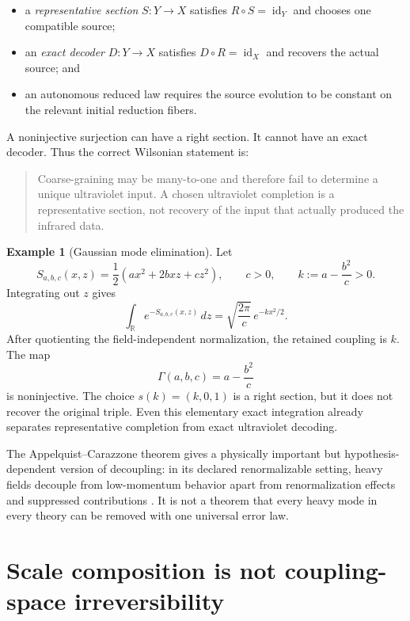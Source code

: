 \documentclass[11pt]{article}
\theoremstyle{definition}
\newtheorem{example}[theorem]{Example}
\theoremstyle{remark}
\newcommand{\id}{\operatorname{id}}
\newcommand{\R}{\mathbb{R}}
\begin{document}
\begin{itemize}
\item a \emph{representative section} \(S:Y\to X\) satisfies
  \(R\circ S=\id_Y\) and chooses one compatible source;
\item an \emph{exact decoder} \(D:Y\to X\) satisfies
  \(D\circ R=\id_X\) and recovers the actual source; and
\item an autonomous reduced law requires the source evolution to be constant
  on the relevant initial reduction fibers.
\end{itemize}

A noninjective surjection can have a right section.  It cannot have an exact
decoder.  Thus the correct Wilsonian statement is:

\begin{quote}
Coarse-graining may be many-to-one and therefore fail to determine a unique
ultraviolet input.  A chosen ultraviolet completion is a representative
section, not recovery of the input that actually produced the infrared data.
\end{quote}

\begin{example}[Gaussian mode elimination]
\label{ex:gaussian}
Let
\[
 S_{a,b,c}(x,z)
 =
 \frac12\left(ax^2+2bxz+cz^2\right),
 \qquad
 c>0,
 \qquad
 k:=a-\frac{b^2}{c}>0.
\]
Integrating out \(z\) gives
\[
 \int_{\R}e^{-S_{a,b,c}(x,z)}\,dz
 =
 \sqrt{\frac{2\pi}{c}}\,
 e^{-kx^2/2}.
\]
After quotienting the field-independent normalization, the retained coupling
is \(k\).  The map
\[
 \Gamma(a,b,c)=a-\frac{b^2}{c}
\]
is noninjective.  The choice \(s(k)=(k,0,1)\) is a right section, but it does
not recover the original triple.  Even this elementary exact integration
already separates representative completion from exact ultraviolet
decoding.
\end{example}

The Appelquist--Carazzone theorem gives a physically important but
hypothesis-dependent version of decoupling: in its declared renormalizable
setting, heavy fields decouple from low-momentum behavior apart from
renormalization effects and suppressed contributions
\cite{AppelquistCarazzone1975}.  It is not a theorem that every heavy mode in
every theory can be removed with one universal error law.

\section{Scale composition is not coupling-space irreversibility}
\label{sec:flow}
\end{document}
